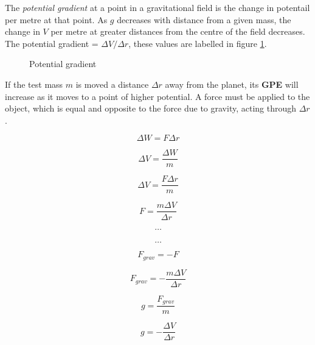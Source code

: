 \documentclass[12pt]{article}
\begin{document}
The \emph{potential gradient} at a point in a gravitational field is the change in potentail per metre at that point. As \(g\) decreases with distance from a given mass, the change in \(V\) per metre at greater distances from the centre of the field decreases. The potential gradient = \(\Delta V / \Delta r\), these values are labelled in figure \ref{img:potential_step}.

\begin{figure}[H]
\centering
{}
\caption{Potential gradient}
\label{img:potential_step}
\end{figure}

If the test mass \(m\) is moved a distance \(\Delta r\) away from the planet, its \textbf{GPE} will increase as it moves to a point of higher potential. A force must be applied to the object, which is equal and opposite to the force due to gravity, acting through \(\Delta r\).

\begin{figure}[H]
\centering
\begin{minipage}{.8\textwidth}
\begin{tcolorbox}[
sharp corners=all,
colback=white,
colframe=white,
size=tight,
boxrule=0.2mm,
left=10mm, right=10mm
]
\begin{multicols}{2}
\noindent

\[\Delta W = F \Delta r\]

\[\Delta V = \dfrac{\Delta W}{m}\]

\[\Delta V = \dfrac{F \Delta r}{m}\]

\[F = \dfrac{m \Delta V}{\Delta r}\]

\[\textbf{\ldots}\]
\columnbreak
\\
\[\textbf{\ldots}\]

\[F_{grav} = -F\]

\[F_{grav} = - \dfrac{m \Delta V}{\Delta r}\]

\[g = \dfrac{F_{grav}}{m}\]

\[g = - \dfrac{\Delta V}{\Delta r}\]

\end{multicols}
\end{tcolorbox}
\end{minipage}
\end{figure}
\end{document}
